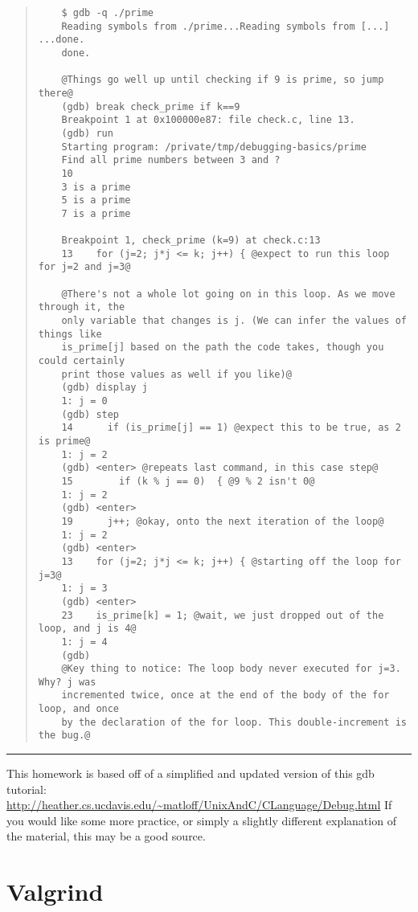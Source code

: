 \documentclass{article}
\begin{document}
\begin{quote}
  \begin{lstlisting}
    $ gdb -q ./prime
    Reading symbols from ./prime...Reading symbols from [...] ...done.
    done.

    @Things go well up until checking if 9 is prime, so jump there@
    (gdb) break check_prime if k==9
    Breakpoint 1 at 0x100000e87: file check.c, line 13.
    (gdb) run
    Starting program: /private/tmp/debugging-basics/prime
    Find all prime numbers between 3 and ?
    10
    3 is a prime
    5 is a prime
    7 is a prime

    Breakpoint 1, check_prime (k=9) at check.c:13
    13    for (j=2; j*j <= k; j++) { @expect to run this loop for j=2 and j=3@

    @There's not a whole lot going on in this loop. As we move through it, the
    only variable that changes is j. (We can infer the values of things like
    is_prime[j] based on the path the code takes, though you could certainly
    print those values as well if you like)@
    (gdb) display j
    1: j = 0
    (gdb) step
    14      if (is_prime[j] == 1) @expect this to be true, as 2 is prime@
    1: j = 2
    (gdb) <enter> @repeats last command, in this case step@
    15        if (k % j == 0)  { @9 % 2 isn't 0@
    1: j = 2
    (gdb) <enter>
    19      j++; @okay, onto the next iteration of the loop@
    1: j = 2
    (gdb) <enter>
    13    for (j=2; j*j <= k; j++) { @starting off the loop for j=3@
    1: j = 3
    (gdb) <enter>
    23    is_prime[k] = 1; @wait, we just dropped out of the loop, and j is 4@
    1: j = 4
    (gdb)
    @Key thing to notice: The loop body never executed for j=3. Why? j was
    incremented twice, once at the end of the body of the for loop, and once
    by the declaration of the for loop. This double-increment is the bug.@
  \end{lstlisting}
\end{quote}

\vfill
\hrule
{\footnotesize
This homework is based off of a simplified and updated version of this gdb
tutorial:
\url{http://heather.cs.ucdavis.edu/~matloff/UnixAndC/CLanguage/Debug.html}
If you would like some more practice, or simply a slightly different
explanation of the material, this may be a good source.
}


\newpage
\section{Valgrind}
\end{document}
